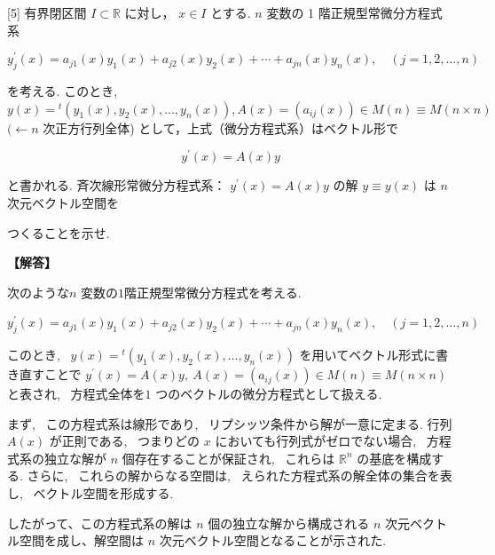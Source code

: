 \documentclass{jsarticle}
\begin{document}
\begin{itembox}[l]{[5]}
有界閉区間 $I \subset \mathbb{R}$ に対し， $x \in I$ とする. $n$ 変数の 1 階正規型常微分方程式系


\begin{equation*}
y_{j}^{\prime}(x)=a_{j 1}(x) y_{1}(x)+a_{j 2}(x) y_{2}(x)+\cdots+a_{j n}(x) y_{n}(x), \quad(j=1,2, \ldots, n) \tag{9}
\end{equation*}


を考える. このとき, $y(x)={ }^{t}\left(y_{1}(x), y_{2}(x), \ldots, y_{n}(x)\right), A(x)=\left(a_{i j}(x)\right) \in M(n) \equiv M(n \times n)$ $(\leftarrow n$ 次正方行列全体) として，上式（微分方程式系）はベクトル形で


\begin{equation*}
y^{\prime}(x)=A(x) y \tag{10}
\end{equation*}


と書かれる. 斉次線形常微分方程式系： $y^{\prime}(x)=A(x) y$ の解 $y \equiv y(x)$ は $n$ 次元ベクトル空間を

つくることを示せ.  
\end{itembox}

\textbf{【解答】}

次のような$n$ 変数の$1$階正規型常微分方程式を考える.

$y_{j}^{\prime}(x)=a_{j 1}(x) y_{1}(x)+a_{j 2}(x) y_{2}(x)+\cdots+a_{j n}(x) y_{n}(x), \quad(j=1,2, \ldots, n)$

このとき, \ $y(x)={ }^{t}\left(y_{1}(x), y_{2}(x), \ldots, y_{n}(x)\right)$ を用いてベクトル形式に書き直すことで $y^{\prime}(x)=A(x) y, \ A(x)=\left(a_{i j}(x)\right) \in M(n) \equiv M(n \times n)$ と表され, \ 方程式全体を$1$ つのベクトルの微分方程式として扱える.

まず, \ この方程式系は線形であり, \ リプシッツ条件から解が一意に定まる. 行列 $A(x)$ が正則である, \ つまりどの $x$ においても行列式がゼロでない場合, \ 方程式系の独立な解が $n$ 個存在することが保証され, \ これらは $\mathbb{R}^n$ の基底を構成する. さらに, \ これらの解からなる空間は, \ えられた方程式系の解全体の集合を表し, \ ベクトル空間を形成する.

したがって、この方程式系の解は $n$ 個の独立な解から構成される $n$ 次元ベクトル空間を成し、解空間は $n$ 次元ベクトル空間となることが示された.
\end{document}
